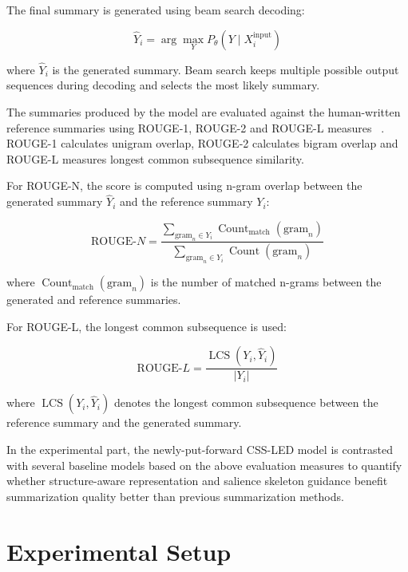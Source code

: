 \documentclass[11pt, a4paper]{article}
\theoremstyle{plain}%
\theoremstyle{remark}%
\theoremstyle{definition}%
\begin{document}
The final summary is generated using beam search decoding:

\begin{equation}
\hat{Y}_i =
\arg\max_{Y}
P_{\theta}\left(Y \mid X_i^{\text{input}}\right)
\end{equation}

where \(\hat{Y}_i\) is the generated summary. Beam search keeps multiple possible output sequences during decoding and selects the most likely summary.

The summaries produced by the model are evaluated against the human-written reference summaries using ROUGE-1, ROUGE-2 and ROUGE-L measures ~\cite{b43}. ROUGE-1 calculates unigram overlap, ROUGE-2 calculates bigram overlap and ROUGE-L measures longest common subsequence similarity.

For ROUGE-N, the score is computed using n-gram overlap between the generated summary \(\hat{Y}_i\) and the reference summary \(Y_i\):

\begin{equation}
\mathrm{ROUGE}\text{-}N =
\frac{
\sum_{\mathrm{gram}_n \in Y_i} \operatorname{Count}_{\text{match}}(\mathrm{gram}_n)
}{
\sum_{\mathrm{gram}_n \in Y_i} \operatorname{Count}(\mathrm{gram}_n)
}
\end{equation}

where \(\operatorname{Count}_{\text{match}}(\mathrm{gram}_n)\) is the number of matched n-grams between the generated and reference summaries.

For ROUGE-L, the longest common subsequence is used:

\begin{equation}
\mathrm{ROUGE}\text{-}L =
\frac{
\operatorname{LCS}(Y_i,\hat{Y}_i)
}{
|Y_i|
}
\end{equation}

where \(\operatorname{LCS}(Y_i,\hat{Y}_i)\) denotes the longest common subsequence between the reference summary and the generated summary.

In the experimental part, the newly-put-forward CSS-LED model is contrasted with several baseline models based on the above evaluation measures to quantify whether structure-aware representation and salience skeleton guidance benefit summarization quality better than previous summarization methods.

\section{Experimental Setup}
\end{document}
